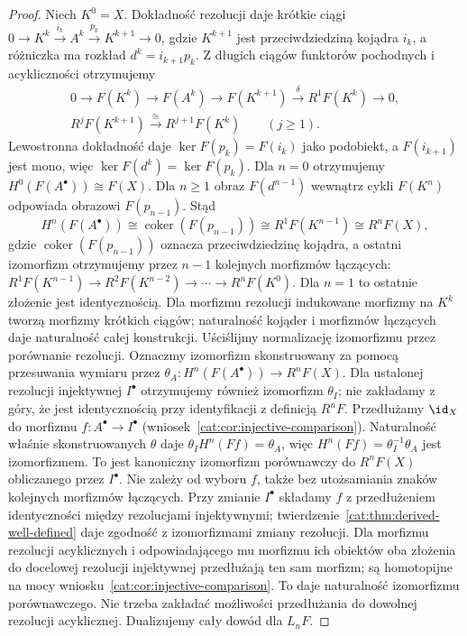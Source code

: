 \begin{proof}
Niech $K^0=X$. Dokładność rezolucji daje krótkie ciągi $0\to K^k\xrightarrow{i_k}A^k\xrightarrow{p_k}K^{k+1}\to0$, gdzie $K^{k+1}$ jest przeciwdziedziną kojądra $i_k$, a różniczka ma rozkład $d^k=i_{k+1}p_k$. Z długich ciągów funktorów pochodnych i acykliczności otrzymujemy
\[
\begin{gathered}
0\to F(K^k)\to F(A^k)\to F(K^{k+1})
 \xrightarrow{\delta}R^1F(K^k)\to0,\\
R^jF(K^{k+1})\xrightarrow{\ \cong\ }R^{j+1}F(K^k)
\qquad(j\ge1).
\end{gathered}
\]
Lewostronna dokładność daje $\ker F(p_k)=F(i_k)$ jako podobiekt, a $F(i_{k+1})$ jest mono, więc $\ker F(d^k)=\ker F(p_k)$. Dla $n=0$ otrzymujemy $H^0(F(A^\bullet))\cong F(X)$. Dla $n\ge1$ obraz $F(d^{n-1})$ wewnątrz cykli $F(K^n)$ odpowiada obrazowi $F(p_{n-1})$. Stąd
\[
 H^n(F(A^\bullet))\cong
 \operatorname{coker}(F(p_{n-1}))\cong R^1F(K^{n-1})
 \cong R^nF(X),
\]
gdzie $\operatorname{coker}(F(p_{n-1}))$ oznacza przeciwdziedzinę kojądra, a ostatni izomorfizm otrzymujemy przez $n-1$ kolejnych morfizmów łączących: $R^1F(K^{n-1})\to R^2F(K^{n-2})\to\cdots\to R^nF(K^0)$. Dla $n=1$ to ostatnie złożenie jest identycznością. Dla morfizmu rezolucji indukowane morfizmy na $K^k$ tworzą morfizmy krótkich ciągów; naturalność kojąder i morfizmów łączących daje naturalność całej konstrukcji. Uściślijmy normalizację izomorfizmu przez porównanie rezolucji. Oznaczmy izomorfizm skonstruowany za pomocą przesuwania wymiaru przez $\theta_A:H^n(F(A^\bullet))\to R^nF(X)$. Dla ustalonej rezolucji injektywnej $I^\bullet$ otrzymujemy również izomorfizm $\theta_I$; nie zakładamy z góry, że jest identycznością przy identyfikacji z definicją $R^nF$. Przedłużamy $\id_X$ do morfizmu $f:A^\bullet\to I^\bullet$ (wniosek~\ref{cat:cor:injective-comparison}). Naturalność właśnie skonstruowanych $\theta$ daje $\theta_I H^n(Ff)=\theta_A$, więc $H^n(Ff)=\theta_I^{-1}\theta_A$ jest izomorfizmem. To jest kanoniczny izomorfizm porównawczy do $R^nF(X)$ obliczanego przez $I^\bullet$. Nie zależy od wyboru $f$, także bez utożsamiania znaków kolejnych morfizmów łączących. Przy zmianie $I^\bullet$ składamy $f$ z przedłużeniem identyczności między rezolucjami injektywnymi; twierdzenie~\ref{cat:thm:derived-well-defined} daje zgodność z izomorfizmami zmiany rezolucji. Dla morfizmu rezolucji acyklicznych i odpowiadającego mu morfizmu ich obiektów oba złożenia do docelowej rezolucji injektywnej przedłużają ten sam morfizm; są homotopijne na mocy wniosku~\ref{cat:cor:injective-comparison}. To daje naturalność izomorfizmu porównawczego. Nie trzeba zakładać możliwości przedłużania do dowolnej rezolucji acyklicznej. Dualizujemy cały dowód dla $L_nF$.
\end{proof}

